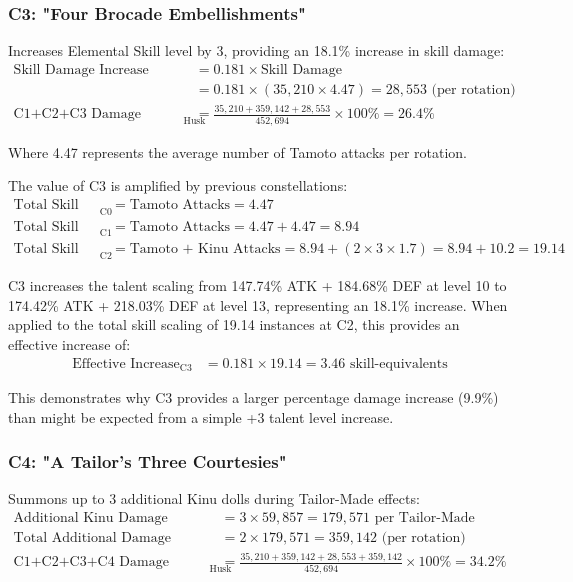 \documentclass[12pt,a4paper]{article}
\begin{document}
\subsubsection{C3: "Four Brocade Embellishments"}
Increases Elemental Skill level by 3, providing an 18.1\% increase in skill damage:
\begin{align}
\text{Skill Damage Increase} &= 0.181 \times \text{Skill Damage} \\
&= 0.181 \times (35,210 \times 4.47) = 28,553 \text{ (per rotation)} \\
\text{C1+C2+C3 Damage Increase}_{\text{Husk}} &= \frac{35,210 + 359,142 + 28,553}{452,694} \times 100\% = 26.4\%
\end{align}

Where 4.47 represents the average number of Tamoto attacks per rotation.

The value of C3 is amplified by previous constellations:
\begin{align}
\text{Total Skill Scaling}_{\text{C0}} &= \text{Tamoto Attacks} = 4.47 \\
\text{Total Skill Scaling}_{\text{C1}} &= \text{Tamoto Attacks} = 4.47 + 4.47 = 8.94 \\
\text{Total Skill Scaling}_{\text{C2}} &= \text{Tamoto + Kinu Attacks} = 8.94 + (2 \times 3 \times 1.7) = 8.94 + 10.2 = 19.14
\end{align}

C3 increases the talent scaling from 147.74\% ATK + 184.68\% DEF at level 10 to 174.42\% ATK + 218.03\% DEF at level 13, representing an 18.1\% increase. When applied to the total skill scaling of 19.14 instances at C2, this provides an effective increase of:
\begin{align}
\text{Effective Increase}_{\text{C3}} &= 0.181 \times 19.14 = 3.46 \text{ skill-equivalents}
\end{align}

This demonstrates why C3 provides a larger percentage damage increase (9.9\%) than might be expected from a simple +3 talent level increase.

\subsubsection{C4: "A Tailor's Three Courtesies"}
Summons up to 3 additional Kinu dolls during Tailor-Made effects:
\begin{align}
\text{Additional Kinu Damage} &= 3 \times 59,857 = 179,571 \text{ per Tailor-Made} \\
\text{Total Additional Damage} &= 2 \times 179,571 = 359,142 \text{ (per rotation)} \\
\text{C1+C2+C3+C4 Damage Increase}_{\text{Husk}} &= \frac{35,210 + 359,142 + 28,553 + 359,142}{452,694} \times 100\% = 34.2\%
\end{align}
\end{document}
